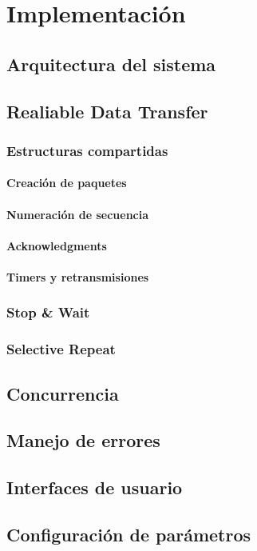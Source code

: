 \section{Implementación}
\subsection{Arquitectura del sistema}
\subsection{Realiable Data Transfer}
\subsubsection{Estructuras compartidas}
\paragraph{Creación de paquetes}
\paragraph{Numeración de secuencia}
\paragraph{Acknowledgments}
\paragraph{Timers y retransmisiones}
\subsubsection{Stop \& Wait}
\subsubsection{Selective Repeat}
\subsection{Concurrencia}
\subsection{Manejo de errores}
\subsection{Interfaces de usuario}
\subsection{Configuración de parámetros}